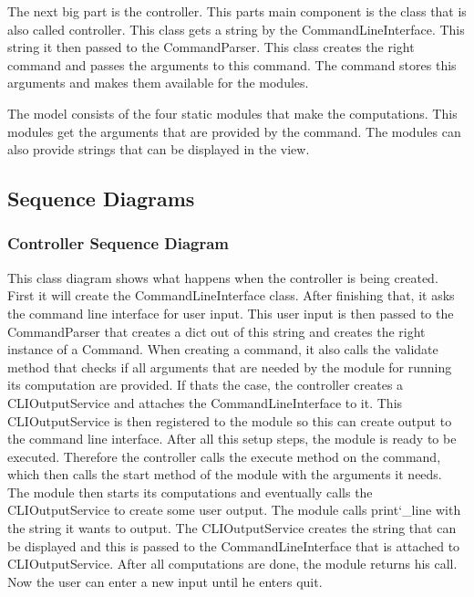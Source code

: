 \documentclass[parskip=full]{scrartcl}
\begin{document}
The next big part is the controller.
This parts main component is the class that is also called controller.
This class gets a string by the CommandLineInterface.
This string it then passed to the CommandParser.
This class creates the right command and passes the arguments to this command.
The command stores this arguments and makes them available for the modules.

The model consists of the four static modules that make the computations.
This modules get the arguments that are provided by the command.
The modules can also provide strings that can be displayed in the view.



\subsection{Sequence Diagrams}

\subsubsection{Controller Sequence Diagram}

This class diagram shows what happens when the controller is being created.
First it will create the CommandLineInterface class.
After finishing that, it asks the command line interface for user input.
This user input is then passed to the CommandParser that creates a dict out of this string and creates the right instance of a Command.
When creating a command, it also calls the validate method that checks if all arguments that are needed by the module for running its computation are provided.
If thats the case, the controller creates a CLIOutputService and attaches the CommandLineInterface to it.
This CLIOutputService is then registered to the module so this can create output to the command line interface.
After all this setup steps, the module is ready to be executed.
Therefore the controller calls the execute method on the command, which then calls the start method of the module with the arguments it needs.
The module then starts its computations and eventually calls the CLIOutputService to create some user output.
The module calls print\char`_line with the string it wants to output.
The CLIOutputService creates the string that can be displayed and this is passed to the CommandLineInterface that is attached to CLIOutputService.
After all computations are done, the module returns his call.
Now the user can enter a new input until he enters quit.
\end{document}
